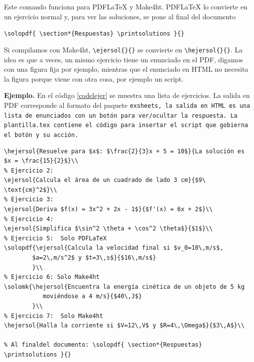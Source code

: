 \documentclass[fleqn,oneside]{article}
\begin{document}
Este comando funciona para PDFLaTeX y Make4ht. PDFLaTeX lo convierte en un ejercicio normal y, para ver las soluciones,  se pone al final del documento

\lstinline+\solopdf{ \section*{Respuestas} \printsolutions }{} +
\ee


Si compilamos con  Make4ht, \lstinline+\ejersol{}{}+ se convierte en  \lstinline+\hejersol{}{}+.
La idea es que a veces, un mismo ejercicio tiene un enunciado en el PDF, digamos con una figura fija por ejemplo, mientras que el enunciado en HTML no necesita la figura porque viene con otra cosa, por ejemplo un script.


\textbf{Ejemplo.} En el código \ref{codelejer} se muestra una lista de ejercicios. La salida en PDF corresponde al formato del paquete \tt{exsheets}, la salida en HTML es una lista de enunciados con un botón para ver/ocultar la respuesta. La \tt{plantilla.tex} contiene el código para insertar el script que gobierna el botón y su acción.

\bigskip
\bigskip\begin{lstlisting}[caption={Lista de ejercicios},label={codelejer}]
% Ejercicio 1:
\hejersol{Resuelve para $x$: $\frac{2}{3}x + 5 = 10$}{La solución es $x = \frac{15}{2}$}\\
% Ejercicio 2:
\ejersol{Calcula el área de un cuadrado de lado 3 cm}{$9\ \text{cm}^2$}\\
% Ejercicio 3:
\ejersol{Deriva $f(x) = 3x^2 + 2x - 1$}{$f'(x) = 6x + 2$}\\
% Ejercicio 4:
\ejersol{Simplifica $\sin^2 \theta + \cos^2 \theta$}{$1$}\\
% Ejercicio 5:  Solo PDFLaTeX
\solopdf{\ejersol{Calcula la velocidad final si $v_0=10\,m/s$,
        $a=2\,m/s^2$ y $t=3\,s$}{$16\,m/s$}
        }\\
% Ejercicio 6: Solo Make4ht
\solomk{\hejersol{Encuentra la energía cinética de un objeto de 5 kg
           moviéndose a 4 m/s}{$40\,J$}
        }\\
% Ejercicio 7:  Solo Make4ht
\hejersol{Halla la corriente si $V=12\,V$ y $R=4\,\Omega$}{$3\,A$}\\

% Al finaldel documento: \solopdf{ \section*{Respuestas} \printsolutions }{}
\end{lstlisting}
\end{document}

